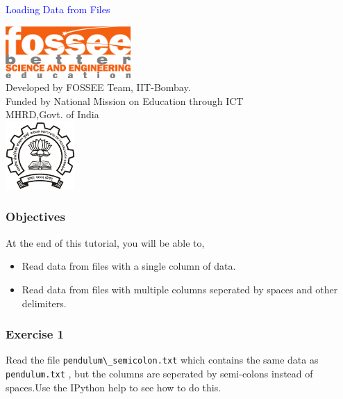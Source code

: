 \documentclass[presentation]{beamer}
\title{}
\author{FOSSEE}
\date{}
\begin{document}
\begin{frame}

\begin{center}
\vspace{12pt}
\textcolor{blue}{\huge Loading Data from Files}
\end{center}
\vspace{18pt}
\begin{center}
\vspace{10pt}
\includegraphics[scale=0.95]{../images/fossee-logo.png}\\
\vspace{5pt}
\scriptsize Developed by FOSSEE Team, IIT-Bombay. \\ 
\scriptsize Funded by National Mission on Education through ICT\\
\scriptsize  MHRD,Govt. of India\\
\includegraphics[scale=0.30]{../images/iitb-logo.png}\\
\end{center}
\end{frame}
\begin{frame}
\frametitle{Objectives}
\label{sec-2}

  At the end of this tutorial, you will be able to,

\begin{itemize}
\item Read data from files with a single column of data.
\item Read data from files with multiple columns seperated by
    spaces and other delimiters.
\end{itemize}
\end{frame}
\begin{frame}
\frametitle{Exercise 1}
\label{sec-3}

  Read the file  \verb~pendulum\_semicolon.txt~  which contains the same data
  as  \verb~pendulum.txt~ , but the columns are seperated by semi-colons instead
  of spaces.Use the IPython help to see how to do this.
\end{frame}
\end{document}
